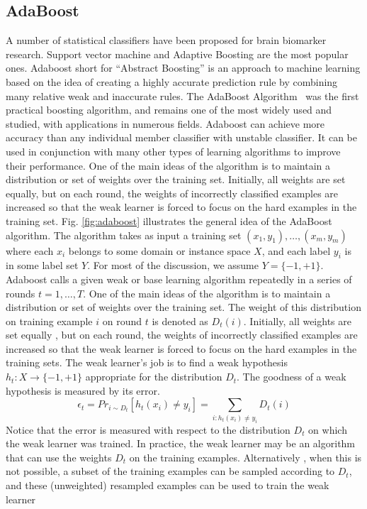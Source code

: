 \subsection{AdaBoost}
A number of statistical classifiers have been proposed for brain biomarker research. Support vector machine and Adaptive Boosting are the most popular ones. Adaboost short for ``Abstract Boosting'' is an approach to machine learning based on the idea of creating a highly accurate prediction rule by combining many relative weak and inaccurate rules. The AdaBoost Algorithm~\citep{freund1996experiments} was the first practical boosting algorithm, and remains one of the most widely used and studied, with applications in numerous fields. Adaboost can achieve more accuracy than any individual member classifier with unstable classifier. It can be used in conjunction with many other types of learning algorithms to improve their performance. One of the main ideas of the algorithm is to maintain a distribution or set of weights over the training set.  Initially, all weights are set equally, but on each round, the weights of incorrectly classified examples are increased so that the weak learner is forced to focus on the hard examples in the training set. Fig. \ref{fig:adaboost} illustrates the general idea of the AdaBoost algorithm. The algorithm takes as input a training set $ (x_1,y_1), \dots , (x_m,y_m) $ where each $ x_i $ belongs to some domain or instance space $ X $, and each label $ y_i $ is in some label set $ Y $. For most of the discussion, we assume $ Y = \{-1, +1\} $. Adaboost calls a given weak or base learning  algorithm repeatedly in a series of rounds $ t = 1,\dots,T $. One of the main ideas of the algorithm is to maintain a distribution or set of weights over the training set. The weight of this distribution on training example $ i $ on round $ t $ is denoted as $ D_t(i) $. Initially, all weights are set equally , but on each round, the weights of incorrectly classified examples are increased so that the weak learner is forced to focus on the hard examples in the training sets.
The weak learner's job is to find a weak hypothesis $ h_t : X \to \{-1 ,+1\}$ appropriate for the distribution $ D_t $. The goodness of a weak hypothesis is measured by its error.
$$ \epsilon_t = Pr_{i \sim D_t}[h_t(x_i) \neq y_i] = \underset{i:h_t(x_i) \neq y_i}{\sum} D_t(i)  $$
Notice that the error is measured with respect to the distribution $ D_t $ on which the weak learner was trained. In practice, the weak learner may be an algorithm that can use the weights $ D_t $ on the training examples. Alternatively , when this is not possible, a subset of the training examples can be sampled according to $ D_t $, and these (unweighted) resampled examples can be used to train the weak learner~\cite{schapire2013explaining}

